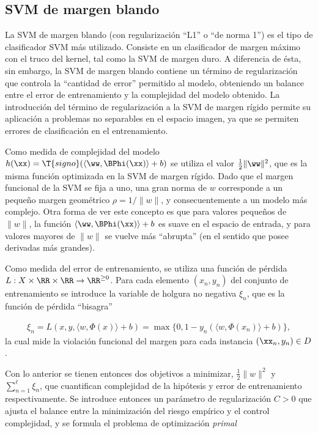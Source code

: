 \subsection{SVM de margen blando}
La SVM de margen blando (con regularización ``L1'' o ``de norma 1'')
es el tipo de clasificador SVM más utilizado.  Consiste en un
clasificador de margen máximo con el truco del kernel, tal como la SVM
de margen duro. A diferencia de ésta, sin embargo, la SVM de margen
blando contiene un término de regularización que controla la
``cantidad de error'' permitido al modelo, obteniendo un balance entre
el error de entrenamiento y la complejidad del modelo obtenido.  La
introducción del término de regularización a la SVM de margen rígido
permite su aplicación a problemas no separables en el espacio imagen,
ya que se permiten errores de clasificación en el entrenamiento.

Como medida de complejidad del modelo
$h(\xx)=\T{signo}(\langle{}\ww,\BPhi(\xx)\rangle{}+b)$
se utiliza el valor $\frac{1}{2}\|\ww\|^2$, que es la misma función optimizada en
la SVM de margen rígido. Dado que el margen funcional
de la SVM se fija a uno, una gran norma de $w$ corresponde a un
pequeño margen geométrico $\rho=1/\|w\|$, y consecuentemente a un modelo más complejo.
Otra forma de ver este concepto es que para valores pequeños de
$\|w\|$, la función $\langle{}\ww,\BPhi(\xx)\rangle+b$ es suave en el
espacio de entrada, y para valores mayores de $\|w\|$ se vuelve más
``abrupta'' (en el sentido que posee derivadas más grandes).

Como medida del error de entrenamiento, se utiliza una función de
pérdida $L:X\times\RR\times\RR\rightarrow\RR^{\geq0}$.  Para cada
elemento $(x_n,y_n)$ del conjunto de entrenamiento se introduce la
variable de holgura no negativa $\xi_n$, que es la función de pérdida
``bisagra''

\begin{align}
\xi_n = 
  L(x,y,\langle{}w,\Phi(x)\rangle+b) =
  \max\{0,1-y_n(\langle{}w,\Phi(x_n)\rangle+b)\},
\end{align}
la cual mide la violación funcional del margen para cada instancia
$(\xx_n,y_n)\in{}D$.

Con lo anterior se tienen entonces dos objetivos a minimizar,
$\frac{1}2{}\|w\|^2$ y $\sum_{n=1}^{\ell}\xi_n$, que cuantifican
complejidad de la hipótesis y error de entrenamiento respectivamente.
Se introduce entonces un parámetro de regularización $C>0$ que
ajusta el balance entre la minimización del riesgo empírico y
el control complejidad, y se formula el problema
de optimización \emph{primal}

